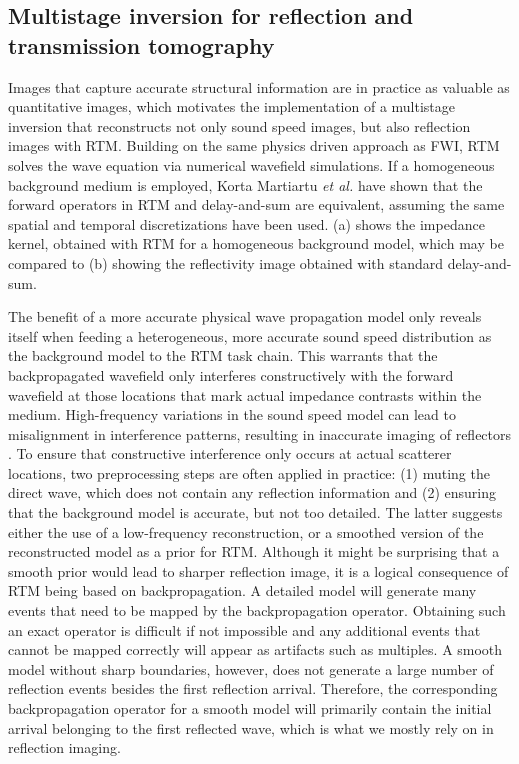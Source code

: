\documentclass[12pt]{iopart}
\begin{document}
\subsection{Multistage inversion for reflection and transmission tomography}
Images that capture accurate structural information are in practice as valuable as quantitative images, which motivates the implementation of a multistage inversion that reconstructs not only sound speed images, but also reflection images with RTM. Building on the same physics driven approach as FWI, RTM solves the wave equation  via numerical wavefield simulations. If a homogeneous background medium is employed, Korta Martiartu \textit{et al.} \cite{Korta_Martiartu_2019} have shown that the forward operators in RTM and delay-and-sum are equivalent, assuming the same spatial and temporal discretizations have been used. (a) shows the impedance kernel, obtained with RTM for a homogeneous background model, which may be compared to (b) showing the reflectivity image obtained with standard delay-and-sum. 

The benefit of a more accurate physical wave propagation model only reveals itself when feeding a heterogeneous, more accurate sound speed distribution as the background model to the RTM task chain. This warrants that the backpropagated wavefield only interferes constructively with the forward wavefield at those locations that mark actual impedance contrasts within the medium. High-frequency variations in the sound speed model can lead to misalignment in interference patterns, resulting in inaccurate imaging of reflectors \cite{Davydenko_Verschuur_2021}. To ensure that constructive interference only occurs at actual scatterer locations, two preprocessing steps are often applied in practice: (1) muting the direct wave, which does not contain any reflection information and (2) ensuring that the background model is accurate, but not too detailed. The latter suggests either the use of a low-frequency reconstruction, or a smoothed version of the reconstructed model as a prior for RTM. Although it might be surprising that a smooth prior would lead to sharper reflection image, it is a logical consequence of RTM being based on backpropagation. A detailed model will generate many events that need to be mapped by the backpropagation operator. Obtaining such an exact operator is difficult if not impossible and any additional events that cannot be mapped correctly will appear as artifacts such as multiples. A smooth model without sharp boundaries, however, does not generate a large number of reflection events besides the first reflection arrival. Therefore, the corresponding backpropagation operator for a smooth model will primarily contain the initial arrival belonging to the first reflected wave, which is what we mostly rely on in reflection imaging.
\end{document}
